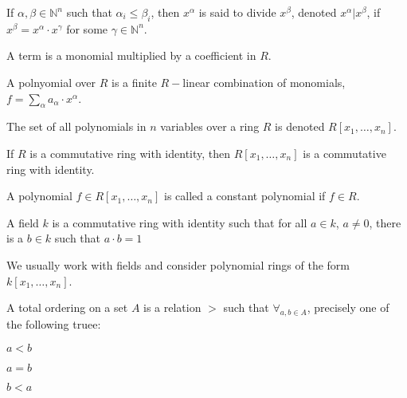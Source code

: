 \documentclass[crop=false,class=book,oneside]{standalone}
\begin{document}
            \begin{definition}
                If $\alpha,\beta \in \mathbb{N}^n$ such that
                $\alpha_i \leq \beta_i$, then $x^{\alpha}$ is said
                to divide $x^\beta$, denoted $x^\alpha \vert x^\beta$,
                if $x^\beta = x^\alpha \cdot x^\gamma$ for some
                $\gamma\in\mathbb{N}^n$.
            \end{definition}
            \begin{definition}
                A term is a monomial multiplied by a coefficient in $R$.
            \end{definition}
            \begin{definition}
                A polnyomial over $R$ is a finite $R-$linear
                combination of monomials,
                $f=\sum_{\alpha} a_{\alpha}\cdot x^{\alpha}$.
            \end{definition}
            \begin{notation}
                The set of all polynomials in $n$ variables over
                a ring $R$ is denoted $R[x_1,\hdots, x_n]$.
            \end{notation}
            \begin{theorem}
                If $R$ is a commutative ring with identity,
                then $R[x_1,\hdots, x_n]$ is a commutative
                ring with identity.
            \end{theorem}
            \begin{definition}
                A polynomial $f\in R[x_1,\hdots, x_n]$ is
                called a constant polynomial if $f\in R$.
            \end{definition}
            \begin{definition}
                A field $k$ is a commutative ring with identity
                such that for all $a\in k$, $a\ne 0$, there is a
                $b\in k$ such that $a\cdot b=1$
            \end{definition}
            \begin{remark}
                We usually work with fields and consider
                polynomial rings of the form $k[x_1,\hdots ,x_n]$.
            \end{remark}
            \begin{definition}
                A total ordering on a set $A$ is a relation
                $>$ such that $\forall_{a,b\in A}$, precisely one
                of the following truee:
                \begin{enumerate}
                    \begin{multicols}{3}
                        \item $a<b$
                        \item $a=b$
                        \item $b<a$
                    \end{multicols}
                \end{enumerate}
            \end{definition}
\end{document}
